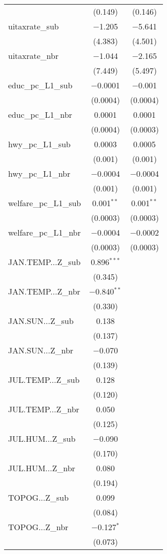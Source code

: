 \begin{table}[!htbp]
\begin{tabular}{@{\extracolsep{5pt}}lcc}
  & (0.149) & (0.146) \\ 
  uitaxrate\_sub & $-$1.205 & $-$5.641 \\ 
  & (4.383) & (4.501) \\ 
  uitaxrate\_nbr & $-$1.044 & $-$2.165 \\ 
  & (7.449) & (5.497) \\ 
  educ\_pc\_L1\_sub & $-$0.0001 & $-$0.001 \\ 
  & (0.0004) & (0.0004) \\ 
  educ\_pc\_L1\_nbr & 0.0001 & 0.0001 \\ 
  & (0.0004) & (0.0003) \\ 
  hwy\_pc\_L1\_sub & 0.0003 & 0.0005 \\ 
  & (0.001) & (0.001) \\ 
  hwy\_pc\_L1\_nbr & $-$0.0004 & $-$0.0004 \\ 
  & (0.001) & (0.001) \\ 
  welfare\_pc\_L1\_sub & 0.001$^{**}$ & 0.001$^{**}$ \\ 
  & (0.0003) & (0.0003) \\ 
  welfare\_pc\_L1\_nbr & $-$0.0004 & $-$0.0002 \\ 
  & (0.0003) & (0.0003) \\ 
  JAN.TEMP...Z\_sub & 0.896$^{***}$ &  \\ 
  & (0.345) &  \\ 
  JAN.TEMP...Z\_nbr & $-$0.840$^{**}$ &  \\ 
  & (0.330) &  \\ 
  JAN.SUN...Z\_sub & 0.138 &  \\ 
  & (0.137) &  \\ 
  JAN.SUN...Z\_nbr & $-$0.070 &  \\ 
  & (0.139) &  \\ 
  JUL.TEMP...Z\_sub & 0.128 &  \\ 
  & (0.120) &  \\ 
  JUL.TEMP...Z\_nbr & 0.050 &  \\ 
  & (0.125) &  \\ 
  JUL.HUM...Z\_sub & $-$0.090 &  \\ 
  & (0.170) &  \\ 
  JUL.HUM...Z\_nbr & 0.080 &  \\ 
  & (0.194) &  \\ 
  TOPOG...Z\_sub & 0.099 &  \\ 
  & (0.084) &  \\ 
  TOPOG...Z\_nbr & $-$0.127$^{*}$ &  \\ 
  & (0.073) &  \\ 

\end{tabular}
\end{table}
